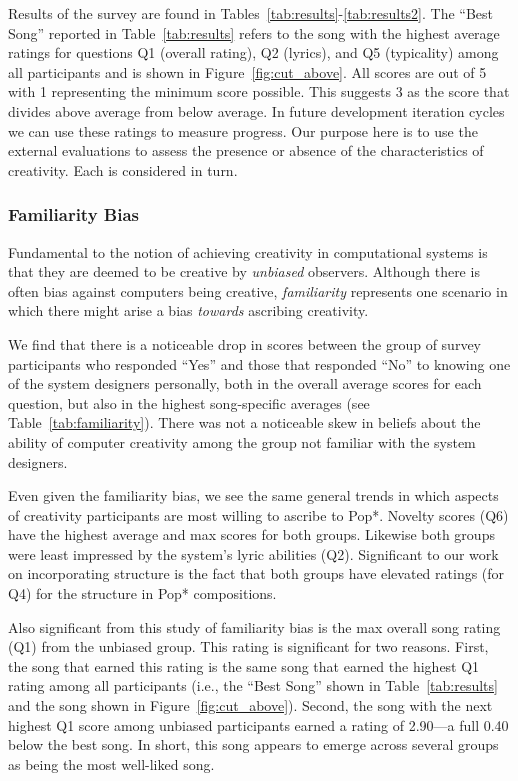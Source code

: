 \documentclass[phd,electronic,oneside,twosidetoc,letterpaper,chaptercenter,parttop,lof,lot]{byumsphd}
\begin{document}
Results of the survey are found in Tables~\ref{tab:results}-\ref{tab:results2}. The ``Best Song'' reported in Table~\ref{tab:results} refers to the song with the highest average ratings for questions Q1 (overall rating), Q2 (lyrics), and Q5 (typicality) among all participants and is shown in Figure~\ref{fig:cut_above}. All scores are out of 5 with 1 representing the minimum score possible. This suggests 3 as the score that divides above average from below average. In future development iteration cycles we can use these ratings to measure progress. Our purpose here is to use the external evaluations to assess the presence or absence of the characteristics of creativity. Each is considered in turn.

\subsubsection{Familiarity Bias}

Fundamental to the notion of achieving creativity in computational systems is that they are deemed to be creative by \textit{unbiased} observers. Although there is often bias against computers being creative, \textit{familiarity} represents one scenario in which there might arise a bias \textit{towards} ascribing creativity.

We find that there is a noticeable drop in scores between the group of survey participants who responded ``Yes'' and those that responded ``No'' to knowing one of the system designers personally, both in the overall average scores for each question, but also in the highest song-specific averages (see Table~\ref{tab:familiarity}). There was not a noticeable skew in beliefs about the ability of computer creativity among the group not familiar with the system designers.

Even given the familiarity bias, we see the same general trends in which aspects of creativity participants are most willing to ascribe to Pop*. Novelty scores (Q6) have the highest average and max scores for both groups. Likewise both groups were least impressed by the system's lyric abilities (Q2). Significant to our work on incorporating structure is the fact that both groups have elevated ratings (for Q4) for the structure in Pop* compositions.

Also significant from this study of familiarity bias is the max overall song rating (Q1) from the unbiased group. This rating is significant for two reasons. First, the song that earned this rating is the same song that earned the highest Q1 rating among all participants (i.e., the ``Best Song'' shown in Table~\ref{tab:results} and the song shown in Figure~\ref{fig:cut_above}). Second, the song with the next highest Q1 score among unbiased participants earned a rating of 2.90---a full 0.40 below the best song. In short, this song appears to emerge across several groups as being the most well-liked song.
\end{document}

